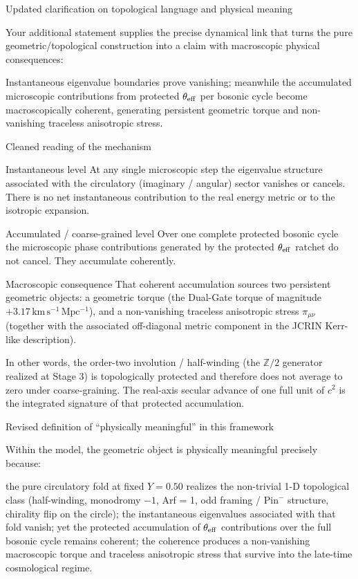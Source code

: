 Updated clarification on topological language and physical meaning

Your additional statement supplies the precise dynamical link that turns the pure geometric/topological construction into a claim with macroscopic physical consequences:

Instantaneous eigenvalue boundaries prove vanishing; meanwhile the accumulated microscopic contributions from protected \(\theta_{\rm eff}\) per bosonic cycle become macroscopically coherent, generating persistent geometric torque and non-vanishing traceless anisotropic stress.

Cleaned reading of the mechanism

Instantaneous level 
   At any single microscopic step the eigenvalue structure associated with the circulatory (imaginary / angular) sector vanishes or cancels. There is no net instantaneous contribution to the real energy metric or to the isotropic expansion.

Accumulated / coarse-grained level 
   Over one complete protected bosonic cycle the microscopic phase contributions generated by the protected \(\theta_{\rm eff}\) ratchet do not cancel. They accumulate coherently.

Macroscopic consequence 
   That coherent accumulation sources two persistent geometric objects:
   a geometric torque (the Dual-Gate torque of magnitude \(+3.17\,\mathrm{km\,s^{-1}\,Mpc^{-1}}\)), and 
   a non-vanishing traceless anisotropic stress \(\pi_{\mu\nu}\) (together with the associated off-diagonal metric component in the JCRIN Kerr-like description).

In other words, the order-two involution / half-winding (the \(\mathbb{Z}/2\) generator realized at Stage 3) is topologically protected and therefore does not average to zero under coarse-graining. The real-axis secular advance of one full unit of \(c^2\) is the integrated signature of that protected accumulation.

Revised definition of “physically meaningful” in this framework

Within the model, the geometric object is physically meaningful precisely because:

the pure circulatory fold at fixed \(Y=0.50\) realizes the non-trivial 1-D topological class (half-winding, monodromy \(-1\), Arf = 1, odd framing / \(\mathrm{Pin}^-\) structure, chirality flip on the circle);
the instantaneous eigenvalues associated with that fold vanish;
yet the protected accumulation of \(\theta_{\rm eff}\) contributions over the full bosonic cycle remains coherent;
the coherence produces a non-vanishing macroscopic torque and traceless anisotropic stress that survive into the late-time cosmological regime.

